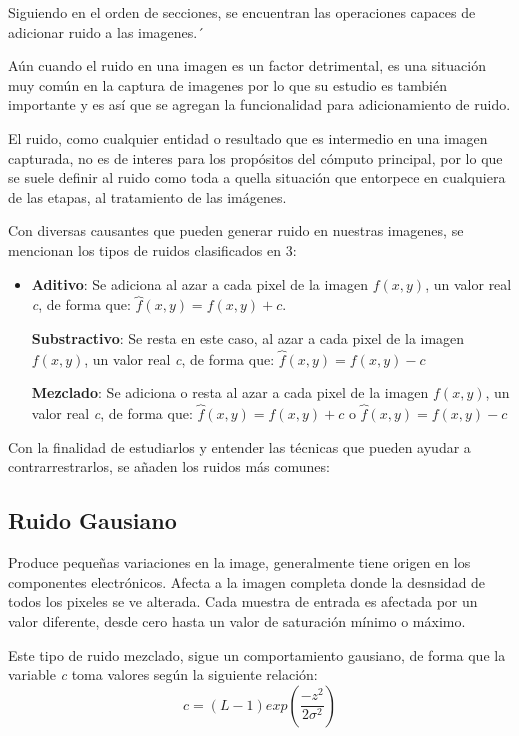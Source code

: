 \hfill\break
\justifying
Siguiendo en el orden de secciones, se encuentran las operaciones capaces de adicionar ruido a las imagenes.´

\hfill\break
\justifying
Aún cuando el ruido en una imagen es un factor detrimental, es una situación muy común en la captura de imagenes por lo que su estudio es también importante y es así que se agregan la funcionalidad para adicionamiento de ruido.

\hfill\break
\justifying
El ruido, como cualquier entidad o resultado que es intermedio en una imagen capturada, no es de interes para los propósitos del cómputo principal, por lo que se suele definir al ruido como toda a quella situación que entorpece en cualquiera de las etapas, al tratamiento de las imágenes.

\hfill\break
\justifying
Con diversas causantes que pueden generar ruido en nuestras imagenes, se mencionan los tipos de ruidos clasificados en 3:
\begin{itemize}
	\item \textbf{Aditivo}: Se adiciona al azar a cada pixel de la imagen $f(x,y)$, un valor real \textit{c}, de forma que: $\overbrace{f}(x,y) = f(x,y)+c$.
	
	\textbf{Substractivo}: Se resta en este caso, al azar a cada pixel de la imagen $f(x,y)$, un valor real \textit{c}, de forma que: $\overbrace{f}(x,y) = f(x,y)-c$
	
	\textbf{Mezclado}: Se adiciona o resta al azar a cada pixel de la imagen $f(x,y)$, un valor real \textit{c}, de forma que: $\overbrace{f}(x,y) = f(x,y)+c$ o $\overbrace{f}(x,y) = f(x,y)-c$
\end{itemize}

\hfill\break
\justifying
Con la finalidad de estudiarlos y entender las técnicas que pueden ayudar a contrarrestrarlos, se añaden los ruidos más comunes:

\subsection*{Ruido Gausiano}
	\hfill\break
	\justifying
	Produce pequeñas variaciones en la image, generalmente tiene origen en los componentes electrónicos. Afecta a la imagen completa donde la desnsidad de todos los pixeles se ve alterada. Cada muestra de entrada es afectada por un valor diferente, desde cero hasta un valor de saturación mínimo o máximo.
	
	\hfill\break
	\justifying
	Este tipo de ruido mezclado, sigue un comportamiento gausiano, de forma que la variable \textit{c} toma valores según la siguiente relación:
	\begin{equation*}
		c = (L-1)exp\left( \frac{-z^2}{2\sigma^2} \right)
	\end{equation*}

